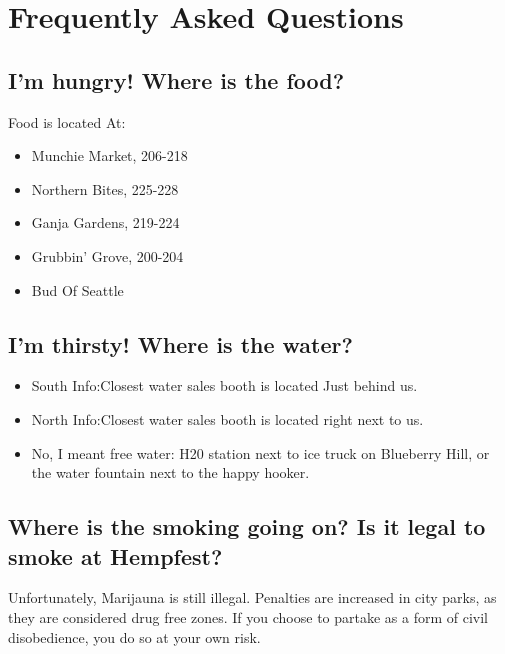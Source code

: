 \chapter{Frequently Asked Questions}




\section{I'm hungry! Where is the food?} %
 Food is located At:
\begin{itemize}
	\item Munchie Market, 206-218
	\item Northern Bites, 225-228
	\item Ganja Gardens, 219-224
	\item Grubbin' Grove, 200-204
	\item Bud Of Seattle
\end{itemize}

\section{I'm thirsty! Where is the water?}
\begin{itemize}
	\item South Info:Closest water sales booth is located Just behind us.
	\item North Info:Closest water sales booth is located right next to us.
	\item No, I meant free water: H20 station next to ice truck on Blueberry Hill, or the water fountain next to the happy hooker.
\end{itemize}


\section{Where is the smoking going on? Is it legal to smoke at Hempfest?}
Unfortunately, Marijauna is still illegal. Penalties are increased in city parks, as they are considered drug free zones. If you choose to partake as a form of civil disobedience, you do so at your own risk. 

